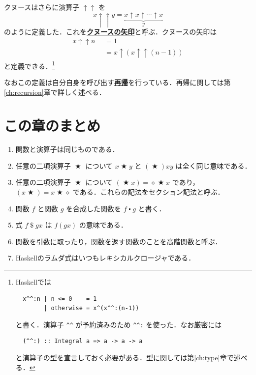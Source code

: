 \documentclass[a4paper,twocolumn]{jsbook}
\newcommand{\programminglanguage}[1]{\textsf{#1}}
\newcommand{\haskell}{\programminglanguage{Haskell}}
\newcommand{\keyword}[1]{{\underline{\textbf{#1}}}}
\newcommand{\code}[1]{\texttt{#1}}
\newcommand{\mKeyword}[1]{\mathsf{#1}} %
\newcommand{\mOtherwiseKeyword}{\mKeyword{otherwise}}
\DeclareMathOperator{\mOtherwise}{\mOtherwiseKeyword}
\newcommand{\mAnonParam}{\diamond}
\DeclareMathOperator{\mApply}{\$}
\DeclareMathOperator{\mBinOp}{\bigstar}
\DeclareMathOperator{\mComp}{\centerdot}
\DeclareMathOperator{\mIn}{{:\!:}}
\DeclareMathOperator{\mMapsTo}{\mapsto}
\newcommand{\mType}[1]{\mathbf{#1}}
\newcommand{\mIntegerType}{\mType{Integer}}
\newcommand{\mGuard}[1]{\mathop{\mid_{#1}}}
\newcommand{\mProj}[2]{#1\mMapsTo#2}
\begin{document}
クヌースはさらに演算子 $\uparrow\uparrow$ を
\begin{equation}
x\uparrow\uparrow y=\underbrace{x\uparrow x\uparrow\dotsb\uparrow x}_{y}%
\end{equation}
のように定義した．これを\keyword{クヌースの矢印}と呼ぶ．クヌースの矢印は
\begin{align}
x\uparrow\uparrow n&\mGuard{n\le0}=1\\
&\mGuard{\mOtherwise}=x\uparrow(x\uparrow\uparrow(n-1))
\end{align}
と定義できる．\footnote{\haskell では
\begin{verbatim}
  x^^:n | n <= 0    = 1
        | otherwise = x^(x^^:(n-1))
\end{verbatim}
と書く．演算子 \code{\textasciicircum\textasciicircum} が予約済みのため \code{\textasciicircum\textasciicircum:} を使った．なお厳密には
\begin{verbatim}
  (^^:) :: Integral a => a -> a -> a
\end{verbatim}
と演算子の型を宣言しておく必要がある．型に関しては第\ref{ch:type}章で述べる．}

なおこの定義は自分自身を呼び出す\keyword{再帰}を行っている．再帰に関しては第\ref{ch:recursion}章で詳しく述べる．


\section{この章のまとめ}

\begin{enumerate}
\item 関数と演算子は同じものである．
\item 任意の二項演算子 $\mBinOp$ について $x\mBinOp y$ と $(\mBinOp)xy$ は全く同じ意味である．
\item 任意の二項演算子 $\mBinOp$ について $(\mBinOp x)=\mAnonParam\mBinOp x$ であり，$(x\mBinOp)=x\mBinOp\mAnonParam$ である．これらの記法をセクション記法と呼ぶ． 
\item 関数 $f$ と関数 $g$ を合成した関数を $f\mComp g$ と書く．
\item 式 $f\mApply gx$ は $f(gx)$ の意味である．
\item 関数を引数に取ったり，関数を返す関数のことを高階関数と呼ぶ．
\item \haskell のラムダ式はいつもレキシカルクロージャである．
\end{enumerate}
\end{document}

